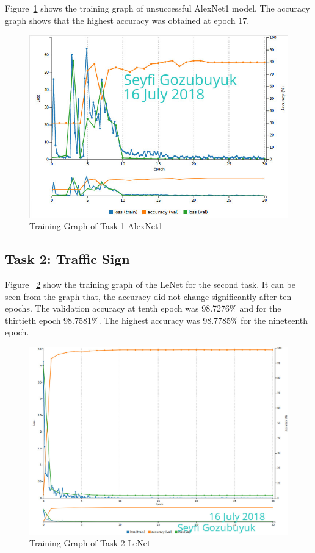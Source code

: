 \documentclass[10pt,journal,compsoc]{IEEEtran}
\begin{document}
Figure~\ref{fig:t1a1g} shows the training graph of unsuccessful AlexNet1 model. The accuracy graph shows that the highest accuracy was obtained at epoch 17.

\begin{figure}[thpb]
      \centering
      \includegraphics[width=\linewidth]{figures/t1a1g.png}
      \caption{Training Graph of Task 1 AlexNet1}
      \label{fig:t1a1g}
\end{figure}

\subsection{Task 2: Traffic Sign}
Figure ~\ref{fig:t2g} show the training graph of the LeNet for the second task. It can be seen from the graph that, the accuracy did not change significantly after ten epochs. The validation accuracy at tenth epoch was 98.7276\% and for the thirtieth epoch 98.7581\%. The highest accuracy was 98.7785\% for the nineteenth epoch. 

\begin{figure}[thpb]
      \centering
      \includegraphics[width=\linewidth]{figures/t2g.png}
      \caption{Training Graph of Task 2 LeNet}
      \label{fig:t2g}
\end{figure}
\end{document}
